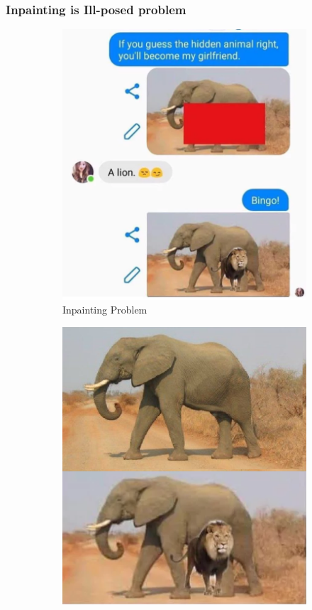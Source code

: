 \documentclass[xcolor=dvipsnames, xetex,serif]{beamer}
\begin{document}
    \begin{frame}
        \frametitle{Inpainting is Ill-posed problem}
        \begin{figure}[H]
            \centering
            \begin{subfigure}{0.45\linewidth}
                \centering
                \includegraphics[width=0.90\linewidth]{images/q_and_a/meme_elephant.png}
                \caption{Inpainting Problem}
            \end{subfigure}
            \begin{subfigure}{0.45\linewidth}
                \centering
                \includegraphics[width=0.90\linewidth]{images/q_and_a/meme_elephant_answer.png}

\end{subfigure}
\end{figure}
\end{frame}
\end{document}

